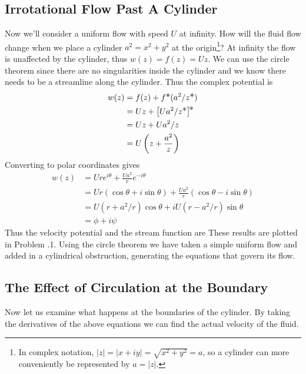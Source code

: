 \documentclass[12pt]{book}
\renewcommand{\star}{{\scalebox{1.1}{*} }}
\begin{document}
\subsection{Irrotational Flow Past A Cylinder}
Now we'll consider a uniform flow with speed $U$ at infinity.  How will the fluid flow change when we place a cylinder $a^2 = x^2 + y^2$ at the origin\footnote{In complex notation, $|z| = |x + iy| = \sqrt{x^2 + y^2} = a$, so a cylinder can more conveniently be represented by $a = |z|$.}?  At infinity the flow is unaffected by the cylinder, thus $w(z) = f(z) = Uz $.  We can use the circle theorem since there are no singularities inside the cylinder and we know there needs to be a streamline along the cylinder.  Thus the complex potential is
\begin{align}
w(z) &= f(z) + f\star(a^2 / z\star) \notag\\
& = Uz + \left[Ua^2 / z\star\right]^{\!_\star} \notag \\
& = Uz + Ua^2/z \notag\\
&= U\left(z + \frac{a^2}{z}\right) \label{complexpotentialflowpastcylinder}
\end{align}
Converting to polar coordinates gives
\begin{align*}
w(z)& = Ure^{i\theta} + \frac{Ua^2}{r}e^{-i\theta} \\
& = Ur\left(\cos\theta + i\sin\theta\right) + \frac{Ua^2}{r}\left(\cos\theta - i\sin\theta\right) \\
&=  U(r + a^2 / r)\cos\theta + iU(r-a^2/r)\sin\theta \\
&= \phi + i\psi 
\end{align*}
Thus the velocity potential and the stream function are
These results are plotted in Problem \thechapter.1.  Using the circle theorem we have taken a simple uniform flow and added in a cylindrical obstruction, generating the equations that govern its flow.


\subsection{The Effect of Circulation at the Boundary}
Now let us examine what happens at the boundaries of the cylinder. By taking the derivatives of the above equations we can find the actual velocity of the fluid.
\end{document}
